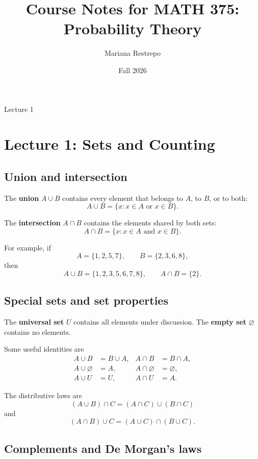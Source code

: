 \documentclass[11pt]{article}
\title{Course Notes for MATH 375: Probability Theory}
\author{Mariana Restrepo}
\date{Fall 2026}
\begin{document}
\maketitle

\begin{center}
\large Lecture 1
\end{center}

\tableofcontents

\section{Lecture 1: Sets and Counting}

\subsection{Union and intersection}

The \textbf{union} $A\cup B$ contains every element that belongs to
$A$, to $B$, or to both:
\[
A\cup B=\{x:x\in A\text{ or }x\in B\}.
\]

The \textbf{intersection} $A\cap B$ contains the elements shared by
both sets:
\[
A\cap B=\{x:x\in A\text{ and }x\in B\}.
\]

For example, if
\[
A=\{1,2,5,7\}, \qquad B=\{2,3,6,8\},
\]
then
\[
A\cup B=\{1,2,3,5,6,7,8\},
\qquad
A\cap B=\{2\}.
\]

\subsection{Special sets and set properties}

The \textbf{universal set} $U$ contains all elements under discussion.
The \textbf{empty set} $\varnothing$ contains no elements.

Some useful identities are
\[
\begin{aligned}
A\cup B &= B\cup A, & A\cap B &= B\cap A,\\
A\cup\varnothing &= A, & A\cap\varnothing &= \varnothing,\\
A\cup U &= U, & A\cap U &= A.
\end{aligned}
\]

The distributive laws are
\[
(A\cup B)\cap C=(A\cap C)\cup(B\cap C)
\]
and
\[
(A\cap B)\cup C=(A\cup C)\cap(B\cup C).
\]

\subsection{Complements and De Morgan's laws}
\end{document}
